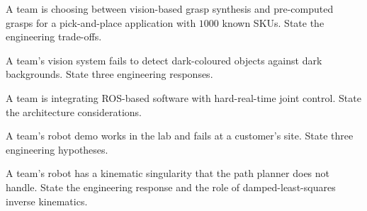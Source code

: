 \begin{exercise}
A team is choosing between vision-based grasp synthesis and pre-computed grasps for a pick-and-place application with $1000$ known SKUs. State the engineering trade-offs.
\end{exercise}

\begin{exercise}
A team's vision system fails to detect dark-coloured objects against dark backgrounds. State three engineering responses.
\end{exercise}

\begin{exercise}
A team is integrating ROS-based software with hard-real-time joint control. State the architecture considerations.
\end{exercise}

\begin{exercise}
A team's robot demo works in the lab and fails at a customer's site. State three engineering hypotheses.
\end{exercise}

\begin{exercise}
A team's robot has a kinematic singularity that the path planner does not handle. State the engineering response and the role of damped-least-squares inverse kinematics.
\end{exercise}
